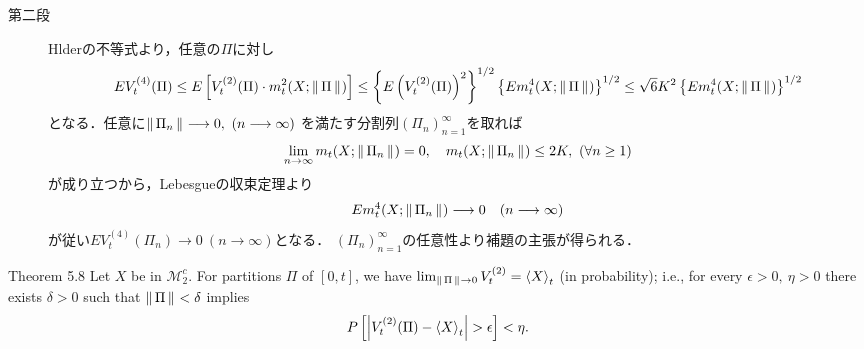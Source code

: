 \begin{prf}
\begin{description}
			\item[第二段]
				Hlderの不等式より，任意の$\Pi$に対し
				\begin{align}
					E V_t^{(4)}(\Pi) \leq E\left[ V_t^{(2)}(\Pi) \cdot m_t^2(X;\left\|\, \Pi\, \right\|_{}) \right]
					\leq \left\{ E \left(V_t^{(2)}(\Pi)\right)^2 \right\}^{1/2}
						\left\{ E m_t^4(X;\left\|\, \Pi\, \right\|_{}) \right\}^{1/2}
					\leq \sqrt{6} K^2 \left\{ E m_t^4(X;\left\|\, \Pi\, \right\|_{}) \right\}^{1/2}
				\end{align}
				となる．任意に$\left\|\, \Pi_n\, \right\|_{} \longrightarrow 0,\ (n \longrightarrow \infty)$
				を満たす分割列$(\Pi_n)_{n=1}^\infty$を取れば
				\begin{align}
					\lim_{n \to \infty} m_t(X;\left\|\, \Pi_n\, \right\|_{}) = 0,
					\quad m_t(X;\left\|\, \Pi_n\, \right\|_{}) \leq 2K,\ (\forall n \geq 1)
				\end{align}
				が成り立つから，Lebesgueの収束定理より
				\begin{align}
					E m_t^4(X;\left\|\, \Pi_n\, \right\|_{}) \longrightarrow 0\quad (n \longrightarrow \infty)
				\end{align}
				が従い$E V_t^{(4)}(\Pi_n) \longrightarrow 0\ (n \longrightarrow \infty)$となる．
				$(\Pi_n)_{n=1}^\infty$の任意性より補題の主張が得られる．
				\QED
		\end{description}
	\end{prf}
	
	\begin{itembox}[l]{Theorem 5.8}
		Let $X$ be in $\mathscr{M}_2^c$. For partitions $\Pi$ of $[0,t]$, we have
		$\lim_{\Norm{\Pi}{} \to 0} V_t^{(2)} = \inprod<X>_t$ (in probability); i.e.,
		for every $\epsilon > 0,\ \eta > 0$ there exists $\delta > 0$ such that $\left\|\, \Pi\, \right\|_{} < \delta$ implies
		\begin{align}
			P\left[ \left| V_t^{(2)}(\Pi) - \inprod<X>_t \right| > \epsilon \right] < \eta.
		\end{align}
	\end{itembox}
	
